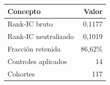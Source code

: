 \begin{tabular}{lr}
\toprule
Concepto & Valor \\
\midrule
Rank-IC bruto & 0,1177 \\
Rank-IC neutralizado & 0,1019 \\
Fracción retenida & 86,62\% \\
Controles aplicados & 14 \\
Cohortes & 117 \\
\bottomrule
\end{tabular}
